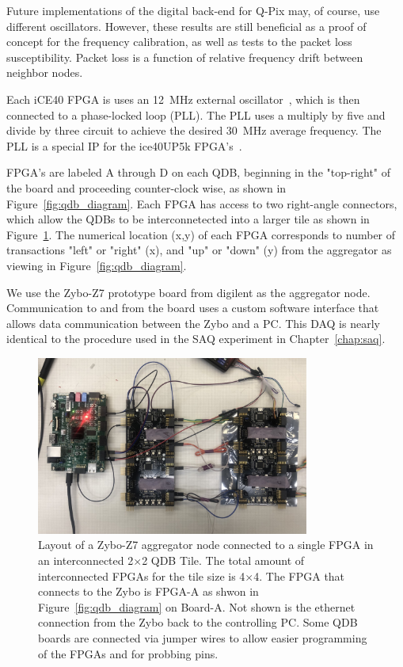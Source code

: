 Future implementations of the digital back-end for Q-Pix may, of course, use different oscillators.
However, these results are still beneficial as a proof of concept for the frequency calibration, as well as tests to the packet loss susceptibility.
Packet loss is a function of relative frequency drift between neighbor nodes.

Each iCE40 FPGA is uses an 12~\unit{MHz} external oscillator~\citep{ecs1612mv}, which is then connected to a phase-locked loop (PLL).
The PLL uses a multiply by five and divide by three circuit to achieve the desired 30~\unit{MHz} average frequency.
The PLL is a special IP for the ice40UP5k FPGA's~\citep{latticeice40up}.

FPGA's are labeled A through D on each QDB, beginning in the "top-right" of the board and proceeding counter-clock wise, as shown in Figure~\ref{fig:qdb_diagram}.
Each FPGA has access to two right-angle connectors, which allow the QDBs to be interconnetected into a larger tile as shown in Figure~\ref{fig:qdb_test_setup}.
The numerical location (x,y) of each FPGA corresponds to number of transactions "left" or "right" (x), and "up" or "down" (y) from the aggregator as viewing in Figure~\ref{fig:qdb_diagram}.

We use the Zybo-Z7 prototype board from digilent as the aggregator node.
Communication to and from the board uses a custom software interface that allows data communication between the Zybo and a PC.
This DAQ is nearly identical to the procedure used in the SAQ experiment in Chapter~\ref{chap:saq}.

\begin{figure}[]
\centering
\includegraphics[width=0.8\textwidth]{./images/qdb_frequency_test_setup.jpg}
\caption{Layout of a Zybo-Z7 aggregator node connected to a single FPGA in an interconnected 2$\times$2 QDB Tile.
The total amount of interconnected FPGAs for the tile size is 4$\times$4.
The FPGA that connects to the Zybo is FPGA-A as shwon in Figure~\ref{fig:qdb_diagram} on Board-A.
Not shown is the ethernet connection from the Zybo back to the controlling PC.
Some QDB boards are connected via jumper wires to allow easier programming of the FPGAs and for probbing pins.
}
\label{fig:qdb_test_setup}
\end{figure}

